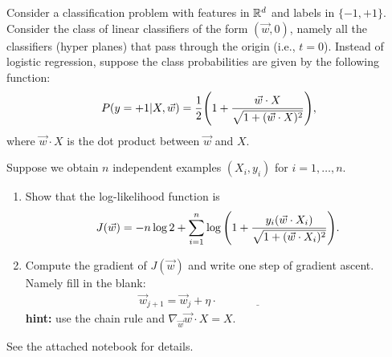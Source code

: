 \documentclass[11pt]{article}
\newenvironment{problem}[2][Problem]{\begin{trivlist}
\item[\hskip \labelsep {\bfseries #1}\hskip \labelsep {\bfseries #2.}]}{\end{trivlist}}
\begin{document}
\begin{problem}{4 (10 points) Different class conditional probabilities}
Consider a classification problem with features in $\mathbb{R}^d$ and labels in $\{-1, +1\}$. Consider the class of linear classifiers of the form $(\vec w, 0)$, namely all the classifiers (hyper planes) that pass through the origin (i.e., $t=0$). Instead of logistic regression, suppose the class probabilities are given by the following function:
\begin{align}
P{\left({y=+1|X, \vec w}\right)} = \frac12{\left({1+\frac{\vec w\cdot X}{\sqrt{1+(\vec w\cdot X)^2}}}\right)}, 
\end{align}
where $\vec w\cdot X$ is the dot product between $\vec w$ and  $X$. 

Suppose we obtain $n$ independent examples $(X_i, y_i)$ for $i=1,\ldots, n$. 
\begin{enumerate}
\item 
Show that the log-likelihood function is
\begin{align}
J(\vec w) = -n\log 2 + \sum_{i=1}^{n} \log {\left({1+ \frac{y_i (\vec w\cdot X_i)}{\sqrt{1+(\vec w\cdot X_i)^2}}}\right)}.
\end{align}
\item
Compute the gradient of $J(\vec w)$ and write one step of gradient ascent. Namely fill in the blank:
\begin{align}
\vec w_{j+1} = \vec w_j + \eta\cdot \underline{\hspace{3cm}}\nonumber
\end{align}
\textbf{hint:} use the chain rule and $\nabla_{\vec w} \vec w\cdot X = X$. 
\end{enumerate}
\end{problem}


\begin{problem}{5 (25 points)}
See the attached notebook for details.
\end{problem}
\end{document}
